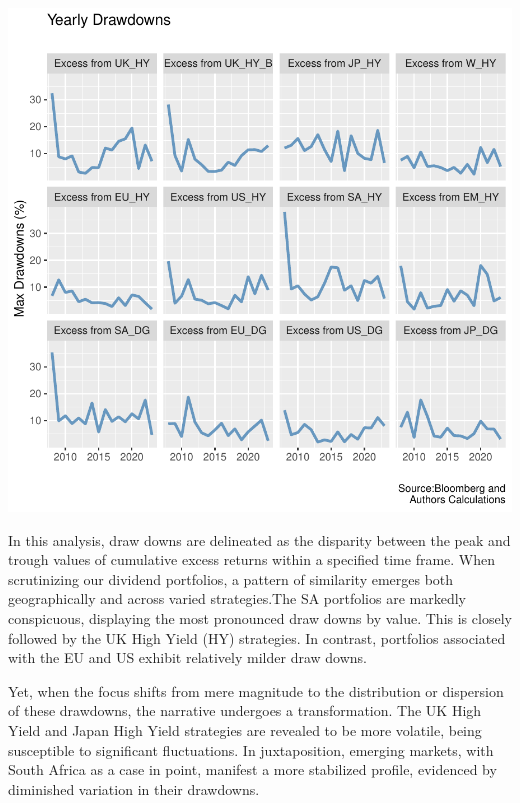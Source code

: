 \documentclass[11pt,preprint, authoryear]{elsarticle}
\let\origfigure\figure
\let\endorigfigure\endfigure
\renewenvironment{figure}[1][2] {
    \expandafter\origfigure\expandafter[H]
} {
    \endorigfigure
}
\numberwithin{equation}{section}
\numberwithin{figure}{section}
\numberwithin{table}{section}
\begin{document}
\begin{figure}[H]

\includegraphics{ThesisWriteUp_files/figure-latex/Figure2-1} \hfill{}

\caption{Rolling 3 Year Returns \label{fig2}}\label{fig:Figure2}
\end{figure}

In this analysis, draw downs are delineated as the disparity between the
peak and trough values of cumulative excess returns within a specified
time frame. When scrutinizing our dividend portfolios, a pattern of
similarity emerges both geographically and across varied strategies.The
SA portfolios are markedly conspicuous, displaying the most pronounced
draw downs by value. This is closely followed by the UK High Yield (HY)
strategies. In contrast, portfolios associated with the EU and US
exhibit relatively milder draw downs.

Yet, when the focus shifts from mere magnitude to the distribution or
dispersion of these drawdowns, the narrative undergoes a transformation.
The UK High Yield and Japan High Yield strategies are revealed to be
more volatile, being susceptible to significant fluctuations. In
juxtaposition, emerging markets, with South Africa as a case in point,
manifest a more stabilized profile, evidenced by diminished variation in
their drawdowns.
\end{document}
